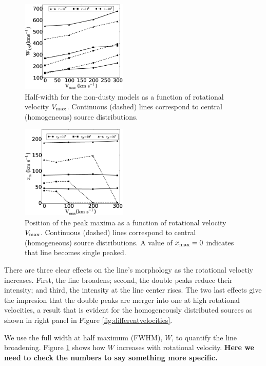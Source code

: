 \documentclass{emulateapj}
\begin{document}
\begin{figure}
    \includegraphics[width=0.45\textwidth]{f2.eps}
    \caption{Half-width for the non-dusty models as a function of
      rotational velocity $V_{\rm max}$. Continuous (dashed) lines
      correspond to central (homogeneous) source
      distributions. \label{fig:widthvsvelocity}} 
\end{figure}


\begin{figure}
    \includegraphics[width=0.45\textwidth]{f3.eps}
\caption{Position of the peak maxima as a function of rotational
  velocity $V_{\rm max}$. Continuous (dashed) lines correspond to
  central (homogeneous) source distributions. A value of $x_{\rm
    max}=0$ indicates that line becomes single
  peaked. \label{fig:maximumsvsvelocity}}  
\end{figure}

There are three clear effects on the line's morphology as the
rotational veloctiy increases. First, the line
broadens; second, the double peaks reduce their intensity; and third,
the intensity at the line center rises. The two last effects give the
impresion that the double peaks are merger into one at high rotational
velocities, a result that is evident for the homogeneously distributed
sources as shown in right panel in Figure \ref{fig:differentvelocities}.

We use the full width at half maximum (FWHM), $W$, to quantify the line
broadening. Figure \ref{fig:widthvsvelocity} shows how $W$ increases
with rotational velocity. {\bf Here we need to check the numbers to
  say something more specific.}
\end{document}
